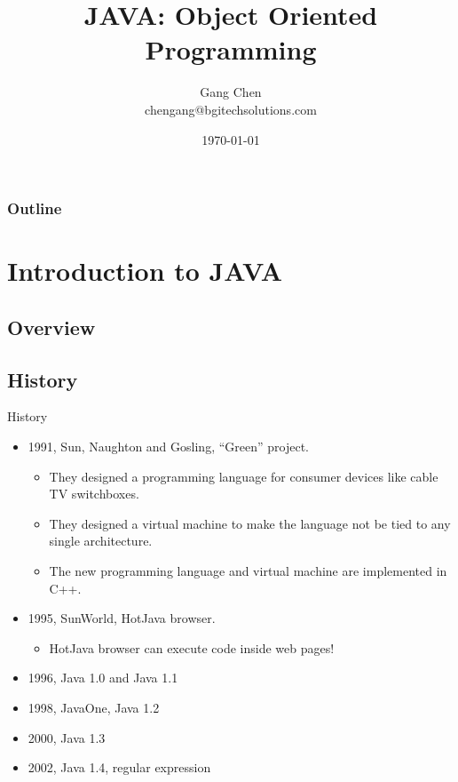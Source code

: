 \documentclass[UTF8]{beamer}
\title{JAVA: Object Oriented Programming}
\author{Gang Chen\\ chengang@bgitechsolutions.com}
\date{\today}
\begin{document}
\begin{frame}
\titlepage
\end{frame}
\begin{frame}[t]\frametitle{Outline}
\tableofcontents[hideallsubsections]
\end{frame}

\section{Introduction to JAVA}

\subsection{Overview}


\subsection{History}
\begin{frame}[t]{History}
  \begin{itemize}
    \item 1991, Sun, Naughton and Gosling, ``Green'' project.\\
    \begin{itemize}
      \item They designed a programming language for consumer devices like cable TV
      switchboxes.
      \item They designed a virtual machine to make the language not be tied to any
      single architecture.
      \item The new programming language and virtual machine are implemented in C++.
    \end{itemize}

    \item 1995, SunWorld, HotJava browser.\\
    \begin{itemize}
      \item HotJava browser can execute code inside web pages!
    \end{itemize}

    \item 1996, Java 1.0 and Java 1.1
    \item 1998, JavaOne, Java 1.2
    \item 2000, Java 1.3
    \item 2002, Java 1.4, regular expression
  \end{itemize}
\end{frame}
\end{document}
